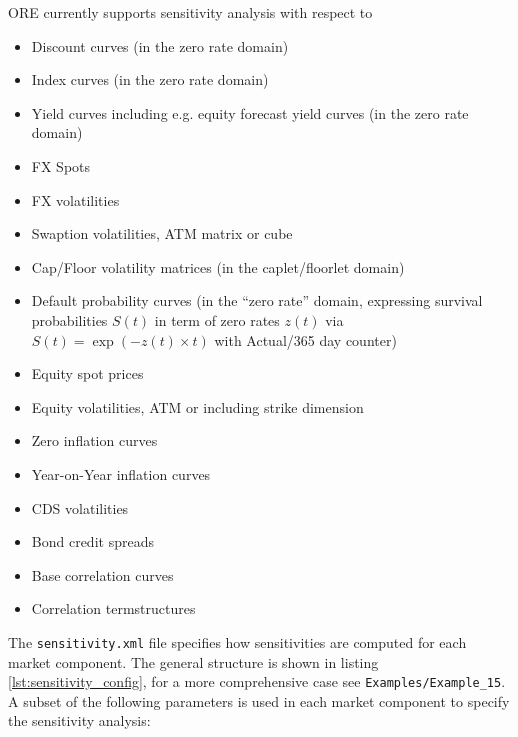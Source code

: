 \documentclass[12pt, a4paper]{article}
\begin{document}
{ORE currently supports sensitivity analysis with respect to
\begin{itemize}
\item Discount curves  (in the zero rate domain)
\item Index curves (in the zero rate domain)
\item Yield curves including e.g. equity forecast yield curves (in the zero rate domain)
\item FX Spots
\item FX volatilities
\item Swaption volatilities, ATM matrix or cube 
\item Cap/Floor volatility matrices (in the caplet/floorlet domain)
\item Default probability curves (in the ``zero rate'' domain, expressing survival probabilities $S(t)$ in term of zero rates $z(t)$ via $S(t)=\exp(-z(t)\times t)$ with Actual/365 day counter)
\item Equity spot prices
\item Equity volatilities, ATM or including strike dimension 
\item Zero inflation curves
\item Year-on-Year inflation curves
\item CDS volatilities
\item Bond credit spreads
\item Base correlation curves
\item Correlation termstructures
\end{itemize}

The {\tt sensitivity.xml} file specifies how sensitivities are computed for each market component. 
The general structure is shown in listing \ref{lst:sensitivity_config}, for a more comprehensive case see {\tt Examples/Example\_15}. A subset of the following parameters is used in each market component to specify the sensitivity analysis:

}
\end{document}
